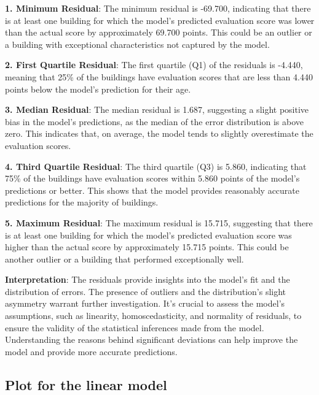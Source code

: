 \documentclass[
  letterpaper,
  DIV=11,
  numbers=noendperiod]{scrartcl}
\begin{document}
\textbf{1. Minimum Residual}: The minimum residual is -69.700,
indicating that there is at least one building for which the model's
predicted evaluation score was lower than the actual score by
approximately 69.700 points. This could be an outlier or a building with
exceptional characteristics not captured by the model.

\textbf{2. First Quartile Residual}: The first quartile (Q1) of the
residuals is -4.440, meaning that 25\% of the buildings have evaluation
scores that are less than 4.440 points below the model's prediction for
their age.

\textbf{3. Median Residual}: The median residual is 1.687, suggesting a
slight positive bias in the model's predictions, as the median of the
error distribution is above zero. This indicates that, on average, the
model tends to slightly overestimate the evaluation scores.

\textbf{4. Third Quartile Residual}: The third quartile (Q3) is 5.860,
indicating that 75\% of the buildings have evaluation scores within
5.860 points of the model's predictions or better. This shows that the
model provides reasonably accurate predictions for the majority of
buildings.

\textbf{5. Maximum Residual}: The maximum residual is 15.715, suggesting
that there is at least one building for which the model's predicted
evaluation score was higher than the actual score by approximately
15.715 points. This could be another outlier or a building that
performed exceptionally well.

\textbf{Interpretation}: The residuals provide insights into the model's
fit and the distribution of errors. The presence of outliers and the
distribution's slight asymmetry warrant further investigation. It's
crucial to assess the model's assumptions, such as linearity,
homoscedasticity, and normality of residuals, to ensure the validity of
the statistical inferences made from the model. Understanding the
reasons behind significant deviations can help improve the model and
provide more accurate predictions.

\hypertarget{plot-for-the-linear-model}{%
\subsection{Plot for the linear model}\label{plot-for-the-linear-model}}
\end{document}
